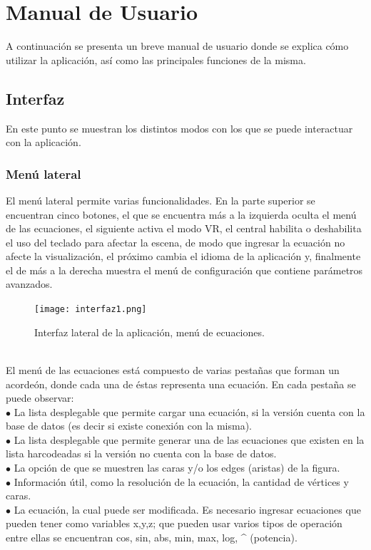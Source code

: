 \documentclass[12pt]{article}
\begin{document}
\section{Manual de Usuario}
A continuación se presenta un breve manual de usuario donde se explica cómo utilizar la aplicación, así como las principales funciones de la misma.
\subsection{Interfaz}
En este punto se muestran los distintos modos con los que se puede interactuar con la aplicación.
\subsubsection{Menú lateral}
El menú lateral permite varias funcionalidades. En la parte superior se encuentran cinco botones, el que se encuentra más a la izquierda oculta el menú de las ecuaciones, el siguiente activa el modo VR, el central habilita o deshabilita el uso del teclado para afectar la escena, de modo que ingresar la ecuación no afecte la visualización, el próximo cambia el idioma de la aplicación y, finalmente el de más a la derecha muestra el menú de configuración que contiene parámetros avanzados.
\begin{figure}
\texttt{[image: interfaz1.png]} 
\caption{Interfaz lateral de la aplicación, menú de ecuaciones.}
\label{fig:subim1}
\end{figure}
\\El menú de las ecuaciones está compuesto de varias pestañas que forman un acordeón, donde cada una de éstas representa una ecuación. En cada pestaña se puede observar:
\\$\bullet$ La lista desplegable que permite cargar una ecuación, si la versión cuenta con la base de datos (es decir si existe conexión con la misma).
\\$\bullet$ La lista desplegable que permite generar una de las ecuaciones que existen en la lista harcodeadas si la versión no cuenta con la base de datos. 
\\$\bullet$ La opción de que se muestren las caras y/o los edges (aristas) de la figura.
\\$\bullet$ Información útil, como la resolución de la ecuación, la cantidad de vértices y caras.
\\$\bullet$ La ecuación, la cual puede ser modificada. Es necesario ingresar ecuaciones que pueden tener como variables x,y,z; que pueden usar varios tipos de operación entre ellas se encuentran cos, sin, abs, min, max, log, \string^ (potencia).
\end{document}
